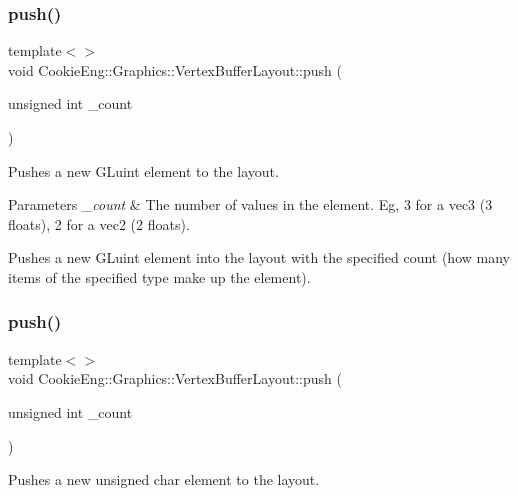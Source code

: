 \subsubsection{\texorpdfstring{push()}{push()}\hspace{0.1cm}{\footnotesize\ttfamily [3/4]}}
{\footnotesize\ttfamily template$<$$>$ \\
void Cookie\+Eng\+::\+Graphics\+::\+Vertex\+Buffer\+Layout\+::push (\begin{DoxyParamCaption}\item[{unsigned int}]{\+\_\+count }\end{DoxyParamCaption})\hspace{0.3cm}{\ttfamily [inline]}}



Pushes a new G\+Luint element to the layout. 


\begin{DoxyParams}{Parameters}
{\em \+\_\+count} & The number of values in the element. Eg, 3 for a vec3 (3 floats), 2 for a vec2 (2 floats).\\
\hline
\end{DoxyParams}
Pushes a new G\+Luint element into the layout with the specified count (how many items of the specified type make up the element). \mbox{\label{class_cookie_eng_1_1_graphics_1_1_vertex_buffer_layout_a3f1a639714762ec45edf48a68995d7bd}} 
\subsubsection{\texorpdfstring{push()}{push()}\hspace{0.1cm}{\footnotesize\ttfamily [4/4]}}
{\footnotesize\ttfamily template$<$$>$ \\
void Cookie\+Eng\+::\+Graphics\+::\+Vertex\+Buffer\+Layout\+::push (\begin{DoxyParamCaption}\item[{unsigned int}]{\+\_\+count }\end{DoxyParamCaption})\hspace{0.3cm}{\ttfamily [inline]}}



Pushes a new unsigned char element to the layout. 


